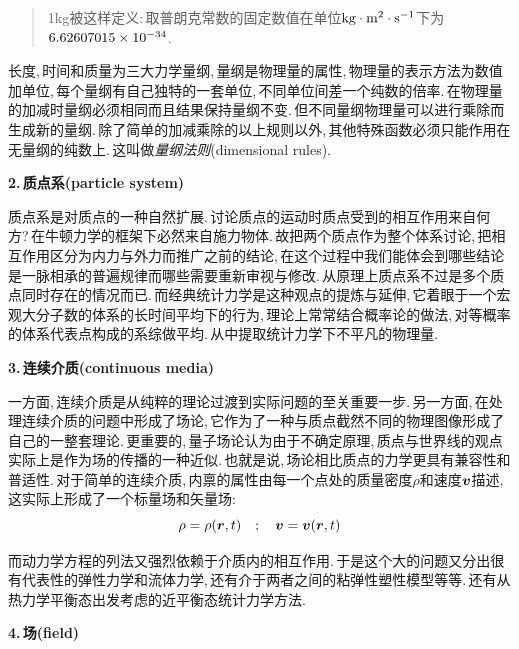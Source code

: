 \begin{verse}
1kg被这样定义:\,取普朗克常数的固定数值在单位$\rm kg\cdot m^2\cdot s^{-1}$下为$\rm 6.62607015\times 10^{-34}$.
\end{verse}

长度,\,时间和质量为三大力学量纲,\,量纲是物理量的属性,\,物理量的表示方法为数值加单位,\,每个量纲有自己独特的一套单位,\,不同单位间差一个纯数的倍率.\,在物理量的加减时量纲必须相同而且结果保持量纲不变.\,但不同量纲物理量可以进行乘除而生成新的量纲.\,除了简单的加减乘除的以上规则以外,\,其他特殊函数必须只能作用在无量纲的纯数上.\,这叫做\emph{量纲法则}(dimensional rules).

\vspace{0.2cm}
{\bf 2.\,质点系(particle system)}

质点系是对质点的一种自然扩展.\,讨论质点的运动时质点受到的相互作用来自何方?\,在牛顿力学的框架下必然来自施力物体.\,故把两个质点作为整个体系讨论,\,把相互作用区分为内力与外力而推广之前的结论,\,在这个过程中我们能体会到哪些结论是一脉相承的普遍规律而哪些需要重新审视与修改.\,从原理上质点系不过是多个质点同时存在的情况而已.\,而经典统计力学是这种观点的提炼与延伸,\,它着眼于一个宏观大分子数的体系的长时间平均下的行为,\,理论上常常结合概率论的做法,\,对等概率的体系代表点构成的系综做平均.\,从中提取统计力学下不平凡的物理量.

\vspace{0.2cm}
{\bf 3.\,连续介质(continuous media)}

一方面,\,连续介质是从纯粹的理论过渡到实际问题的至关重要一步.\,另一方面,\,在处理连续介质的问题中形成了场论,\,它作为了一种与质点截然不同的物理图像形成了自己的一整套理论.\,更重要的,\,量子场论认为由于不确定原理,\,质点与世界线的观点实际上是作为场的传播的一种近似.\,也就是说,\,场论相比质点的力学更具有兼容性和普适性.\,对于简单的连续介质,\,内禀的属性由每一个点处的质量密度$\rho$和速度$\boldsymbol{v}$描述,\,这实际上形成了一个标量场和矢量场:
\[\rho=\rho(\boldsymbol{r},t) \quad;\quad \boldsymbol{v}=\boldsymbol{v}(\boldsymbol{r},t)\]

而动力学方程的列法又强烈依赖于介质内的相互作用.\,于是这个大的问题又分出很有代表性的弹性力学和流体力学,\,还有介于两者之间的粘弹性塑性模型等等.\,还有从热力学平衡态出发考虑的近平衡态统计力学方法.

\vspace{0.2cm}
{\bf 4.\,场(field)}


